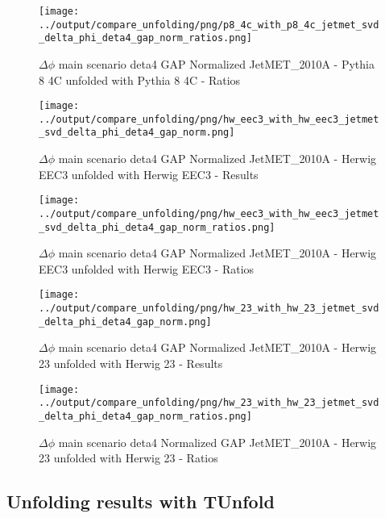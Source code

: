\documentclass[11pt]{book}
\begin{document}
\begin{figure}[ht]
\centering
\texttt{[image: ../output/compare\_unfolding/png/p8\_4c\_with\_p8\_4c\_jetmet\_svd\_delta\_phi\_deta4\_gap\_norm\_ratios.png]}
\caption{$\Delta\phi$ main scenario deta4 GAP Normalized JetMET\_2010A - Pythia 8 4C unfolded with Pythia 8 4C - Ratios}
\label{p8_p8_jetmet_svd_delta_phi_deta4_gap_norm_b}
\end{figure}

\begin{figure}[ht]
\centering
\texttt{[image: ../output/compare\_unfolding/png/hw\_eec3\_with\_hw\_eec3\_jetmet\_svd\_delta\_phi\_deta4\_gap\_norm.png]}
\caption{$\Delta\phi$ main scenario deta4 GAP Normalized JetMET\_2010A - Herwig EEC3 unfolded with Herwig EEC3 - Results}
\label{hw_eec3_hw_eec3_jetmet_svd_delta_phi_deta4_gap_norm_a}
\end{figure}

\begin{figure}[ht]
\centering
\texttt{[image: ../output/compare\_unfolding/png/hw\_eec3\_with\_hw\_eec3\_jetmet\_svd\_delta\_phi\_deta4\_gap\_norm\_ratios.png]}
\caption{$\Delta\phi$ main scenario deta4 GAP Normalized JetMET\_2010A - Herwig EEC3 unfolded with Herwig EEC3 - Ratios}
\label{hw_eec3_hw_eec3_jetmet_svd_delta_phi_deta4_gap_norm_b}
\end{figure}

\begin{figure}[ht]
\centering
\texttt{[image: ../output/compare\_unfolding/png/hw\_23\_with\_hw\_23\_jetmet\_svd\_delta\_phi\_deta4\_gap\_norm.png]}
\caption{$\Delta\phi$ main scenario deta4 GAP Normalized JetMET\_2010A - Herwig 23 unfolded with Herwig 23 - Results}
\label{hw_23_hw_23_jetmet_svd_delta_phi_deta4_gap_norm_a}
\end{figure}

\begin{figure}[ht]
\centering
\texttt{[image: ../output/compare\_unfolding/png/hw\_23\_with\_hw\_23\_jetmet\_svd\_delta\_phi\_deta4\_gap\_norm\_ratios.png]}
\caption{$\Delta\phi$ main scenario deta4 Normalized GAP JetMET\_2010A - Herwig 23 unfolded with Herwig 23 - Ratios}
\label{hw_23_hw_23_jetmet_svd_delta_phi_deta4_gap_norm_b}
\end{figure}




\clearpage
\subsection{Unfolding results with TUnfold}
\end{document}

